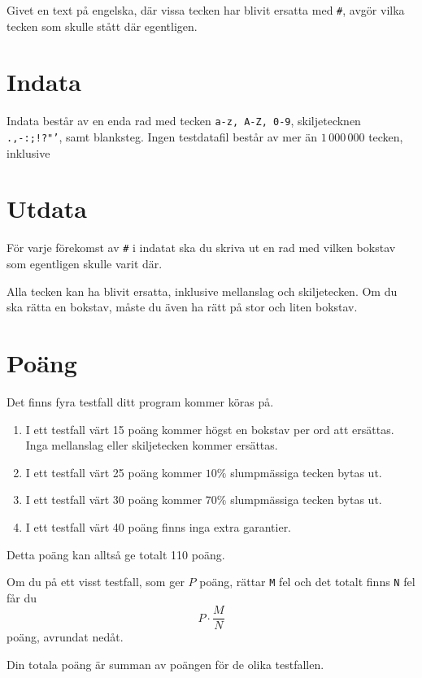 
Givet en text på engelska, där vissa tecken har blivit ersatta med \texttt{#}, avgör vilka tecken som skulle stått där egentligen.

\section*{Indata}
Indata består av en enda rad med tecken \texttt{a-z, A-Z, 0-9}, skiljetecknen \texttt{.,-:;!?"'}, samt blanksteg.
Ingen testdatafil består av mer än $1\,000\,000$ tecken, inklusive 

\section*{Utdata}
För varje förekomst av \texttt{#} i indatat ska du skriva ut en rad med vilken bokstav som egentligen skulle varit där.

Alla tecken kan ha blivit ersatta, inklusive mellanslag och skiljetecken. Om du ska rätta en bokstav, måste du även ha rätt på stor och liten bokstav.

\section*{Poäng}

Det finns fyra testfall ditt program kommer köras på.
\begin{enumerate}
  \item I ett testfall värt 15 poäng kommer högst en bokstav per ord att ersättas. Inga mellanslag eller skiljetecken kommer ersättas.
  \item I ett testfall värt 25 poäng kommer $10\%$ slumpmässiga tecken bytas ut.
  \item I ett testfall värt 30 poäng kommer $70\%$ slumpmässiga tecken bytas ut.
  \item I ett testfall värt 40 poäng finns inga extra garantier.
\end{enumerate}

Detta poäng kan alltså ge totalt 110 poäng.

Om du på ett visst testfall, som ger $P$ poäng, rättar \texttt{M} fel och det totalt finns \texttt{N} fel får du 
$$P \cdot \frac{M}{N}$$
poäng, avrundat nedåt.

Din totala poäng är summan av poängen för de olika testfallen.
